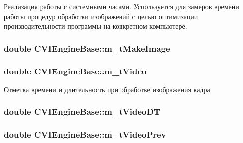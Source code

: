 Реализация работы с системными часами. Успользуется для замеров времени работы процедур обработки изображений с целью оптимизации производительности программы на конкретном компьютере. 

\hypertarget{class_c_v_i_engine_base_a0e3c27e7d2ed527eca5445a669080838}{
\subsubsection[{m\+\_\+t\+Make\+Image}]{\setlength{\rightskip}{0pt plus 5cm}double C\+V\+I\+Engine\+Base\+::m\+\_\+t\+Make\+Image}}\label{class_c_v_i_engine_base_a0e3c27e7d2ed527eca5445a669080838}




\hypertarget{class_c_v_i_engine_base_a0d6409bd350e84190cd6904732c4fe83}{
\subsubsection[{m\+\_\+t\+Video}]{\setlength{\rightskip}{0pt plus 5cm}double C\+V\+I\+Engine\+Base\+::m\+\_\+t\+Video}}\label{class_c_v_i_engine_base_a0d6409bd350e84190cd6904732c4fe83}


Отметка времени и длительность при обработке изображения кадра 

\hypertarget{class_c_v_i_engine_base_a0bbf6f3d2d6b80fec8d223ffb44a6791}{
\subsubsection[{m\+\_\+t\+Video\+D\+T}]{\setlength{\rightskip}{0pt plus 5cm}double C\+V\+I\+Engine\+Base\+::m\+\_\+t\+Video\+D\+T}}\label{class_c_v_i_engine_base_a0bbf6f3d2d6b80fec8d223ffb44a6791}




\hypertarget{class_c_v_i_engine_base_a45286d497ebc137775cda4999ff9fed6}{
\subsubsection[{m\+\_\+t\+Video\+Prev}]{\setlength{\rightskip}{0pt plus 5cm}double C\+V\+I\+Engine\+Base\+::m\+\_\+t\+Video\+Prev}}\label{class_c_v_i_engine_base_a45286d497ebc137775cda4999ff9fed6}


